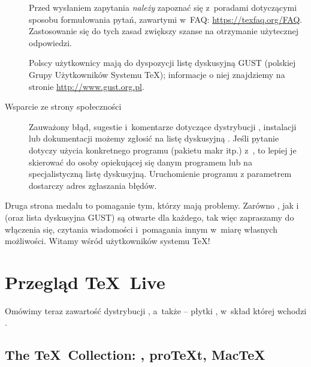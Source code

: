 \documentclass{article}
\begin{document}
\begin{description}
Przed wysłaniem zapytania \emph{należy} zapoznać się z~poradami dotyczącymi sposobu
formułowania pytań, zawartymi w~FAQ:
\url{https://texfaq.org/FAQ}. Zastosowanie się do tych zasad zwiększy szanse na otrzymanie użytecznej odpowiedzi.

Polscy użytkownicy mają do dyspozycji listę dyskusyjną GUST (polskiej Grupy
Użytkowników Systemu \TeX); informacje o niej
znajdziemy na stronie \url{http://www.gust.org.pl}.

\item [Wsparcie ze strony społeczności \TL{}] Zauważony błąd, sugestie i~komentarze dotyczące dystrybucji \TL{}, instalacji
lub dokumentacji możemy zgłosić na listę dyskusyjną . Jeśli pytanie dotyczy użycia konkretnego programu
(pakietu makr itp.) z~\TL{}, to lepiej je  skierować   do osoby
opiekującej się danym programem lub na specjalistyczną listę dyskusyjną. Uruchomienie programu z parametrem   dostarczy adres  zgłaszania błędów.
\end{description}

Druga strona medalu to pomaganie tym, którzy mają problemy. Zarówno
, jak i~ (oraz lista dyskusyjna GUST)
są otwarte dla każdego,
tak więc zapraszamy do włączenia się, czytania wiadomości i~pomagania
innym w~miarę własnych możliwości. Witamy wśród użytkowników
systemu \TeX!

\section{Przegląd \protect\TeX\protect\ Live}
\label{sec:overview-tl}

Omówimy teraz zawartość dystrybucji \TL{}, a~także \TK{} --
płytki \DVD, w~skład której wchodzi \TL.

\subsection{The \protect\TeX\protect\ Collection: \protect\TL, pro\protect\TeX{}t, Mac\protect\TeX}
\label{sec:tl-coll-dists}
\end{document}
